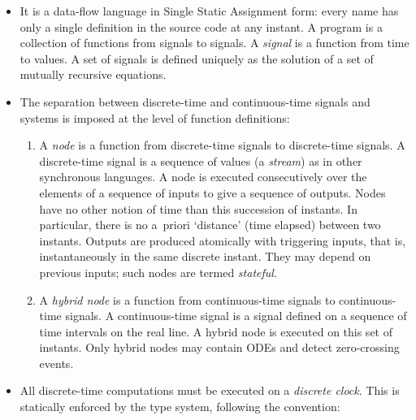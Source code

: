 \documentclass[11pt,titlepage,twoside]{report}
\newenvironment{flatitemize}
  {\setenvclass{itemize}{flatitemize}%
   \begin{itemize}}
  {\end{itemize}}
\newenvironment{flatitemize}
  {\begin{itemize}[leftmargin=*]}
  {\end{itemize}}
\newcommand{\zelus}{{\sf Z\'elus}}
\begin{document}
\begin{flatitemize}
\item
It is a data-flow language in Single Static Assignment form: every name has 
only a single definition in the source code at any instant. A program is a 
collection of functions from signals to signals. A \emph{signal} is a 
function from time
to values. A set of signals is defined uniquely as
the solution of a set of mutually recursive equations.
\item
The separation between discrete-time and continuous-time signals and
systems is imposed at the level of function definitions:
  \begin{enumerate}
  \item
    A \emph{node} is a function from discrete-time signals to
    discrete-time signals. A discrete-time signal is a sequence of values (a 
    \emph{stream}) as in other synchronous languages.
    A node is executed consecutively over the elements of a sequence of 
    inputs to give a sequence of outputs.
    Nodes have no other notion of time than this succession of instants.
    In particular, there is no a~priori `distance' (time elapsed) between 
    two instants.
    Outputs are produced atomically with triggering inputs, that is, 
    instantaneously in the same discrete instant.
    They may depend on previous inputs; such nodes are termed 
    \emph{stateful}.
  \item
    A \emph{hybrid node} is a function from continuous-time signals to
    continuous-time signals. A continuous-time signal is a signal
    defined on a sequence of time intervals on the real
    line.
    A hybrid node is executed on this set of instants. Only hybrid nodes
    may contain ODEs and detect zero-crossing events.
  \end{enumerate}
\item
All
discrete-time computations must be executed on a \emph{discrete clock}.
This is statically enforced by the type system, following the convention:


\end{flatitemize}
\end{document}
